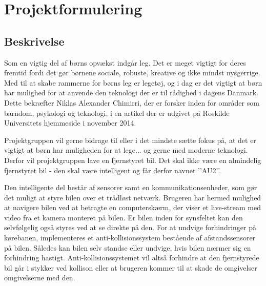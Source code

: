 \chapter{Projektformulering} \label{ch:projektformulering}


\section{Beskrivelse} \label{sec:beskrivelse}
Som en vigtig del af børns opvækst indgår leg. Det er meget vigtigt for deres fremtid fordi det gør børnene sociale, robuste, kreative og ikke mindst nysgerrige. Med til at skabe rammerne for børns leg er legetøj, og i dag er det vigtigt at børn har mulighed for at anvende den teknologi der er til rådighed i dagens Danmark. Dette bekræfter Niklas Alexander Chimirri, der er forsker inden for områder som barndom, psykologi og teknologi, i en artikel der er udgivet på Roskilde Universitets hjemmeside i november 2014. 

Projektgruppen vil gerne bidrage til eller i det mindste sætte fokus på, at det er vigtigt at børn har muligheden for at lege... og gerne med moderne teknologi. Derfor vil projektgruppen lave en fjernstyret bil. Det skal ikke være en almindelig fjernstyret bil - den skal være intelligent og får derfor navnet ’’AU2’’.

Den intelligente del består af sensorer samt en kommunikationsenheder, som gør det muligt at styre bilen over et trådløst netværk. Brugeren har hermed mulighed at navigere bilen ved at betragte en computerskærm, der viser et live-stream med video fra et kamera monteret på bilen. Er bilen inden for synsfeltet kan den selvfølgelig også styres ved at se direkte på den. For at undvige forhindringer på kørebanen, implementeres et anti-kollisionssystem bestående af afstandssensorer på bilen. Således kan bilen selv standse eller undvige, hvis bilen nærmer sig en forhindring hastigt. Anti-kollisionssystemet vil altså forhindre at den fjernstyrede bil går i stykker ved kollison eller at brugeren kommer til at skade de omgivelser omgivelserne med den.
\clearpage

